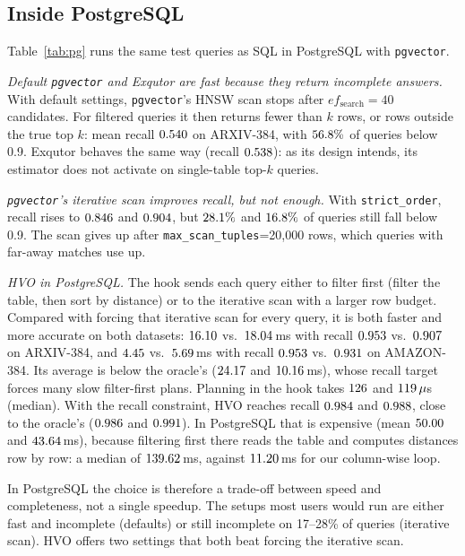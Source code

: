 \documentclass[sigconf, nonacm]{acmart}
\begin{document}
\subsection{Inside PostgreSQL}\label{sec:eval_pg}
Table~\ref{tab:pg} runs the same test queries as SQL in PostgreSQL with \texttt{pgvector}.

\emph{Default \texttt{pgvector} and Exqutor are fast because they return incomplete answers.} With default settings, \texttt{pgvector}'s HNSW scan stops after $ef_{\text{search}}=40$ candidates. For filtered queries it then returns fewer than $k$ rows, or rows outside the true top $k$: mean recall $0.540$ on ARXIV-384, with $56.8\%$ of queries below 0.9. Exqutor behaves the same way (recall $0.538$): as its design intends, its estimator does not activate on single-table top-$k$ queries.

\emph{\texttt{pgvector}'s iterative scan improves recall, but not enough.} With \texttt{strict\_order}, recall rises to $0.846$ and $0.904$, but $28.1\%$ and $16.8\%$ of queries still fall below 0.9. The scan gives up after \texttt{max\_scan\_tuples}=20{,}000 rows, which queries with far-away matches use up.

\emph{HVO in PostgreSQL.} The hook sends each query either to filter first (filter the table, then sort by distance) or to the iterative scan with a larger row budget. Compared with forcing that iterative scan for every query, it is both faster and more accurate on both datasets: $16.10$ vs.\ $18.04$\,ms with recall $0.953$ vs.\ $0.907$ on ARXIV-384, and $4.45$ vs.\ $5.69$\,ms with recall $0.953$ vs.\ $0.931$ on AMAZON-384. Its average is below the oracle's ($24.17$ and $10.16$\,ms), whose recall target forces many slow filter-first plans. Planning in the hook takes $126$ and $119\,\mu$s (median). With the recall constraint, HVO reaches recall $0.984$ and $0.988$, close to the oracle's ($0.986$ and $0.991$). In PostgreSQL that is expensive (mean $50.00$ and $43.64$\,ms), because filtering first there reads the table and computes distances row by row: a median of $139.62$\,ms, against $11.20$\,ms for our column-wise loop.

In PostgreSQL the choice is therefore a trade-off between speed and completeness, not a single speedup. The setups most users would run are either fast and incomplete (defaults) or still incomplete on 17--28\% of queries (iterative scan). HVO offers two settings that both beat forcing the iterative scan.
\end{document}
